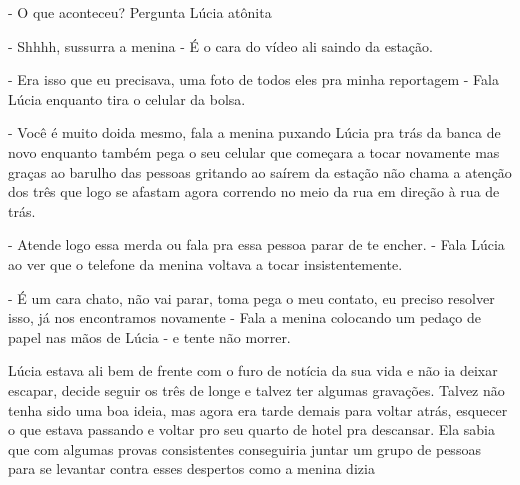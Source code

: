 - O que aconteceu? Pergunta Lúcia atônita

- Shhhh, sussurra a menina - É o cara do vídeo ali saindo da estação.

- Era isso que eu precisava, uma foto de todos eles pra minha reportagem - Fala Lúcia enquanto tira o celular da bolsa.

- Você é muito doida mesmo, fala a menina puxando Lúcia pra trás da banca de novo enquanto também pega o seu celular que começara a tocar novamente mas graças ao barulho das pessoas gritando ao saírem da estação não chama a atenção dos três que logo se afastam agora correndo no meio da rua em direção à rua de trás.

- Atende logo essa merda ou fala pra essa pessoa parar de te encher. - Fala Lúcia ao ver que o telefone da menina voltava a tocar insistentemente.

- É um cara chato, não vai parar, toma pega o meu contato, eu preciso resolver isso, já nos encontramos novamente - Fala a menina colocando um pedaço de papel nas mãos de Lúcia - e tente não morrer.


Lúcia estava ali bem de frente com o furo de notícia da sua vida e não ia deixar escapar, decide seguir os três de longe e talvez ter algumas gravações. Talvez não tenha sido uma boa ideia, mas agora era tarde demais para voltar atrás, esquecer o que estava passando e voltar pro seu quarto de hotel pra descansar. Ela sabia que com algumas provas consistentes conseguiria juntar um grupo de pessoas para se levantar contra esses despertos como a menina dizia
